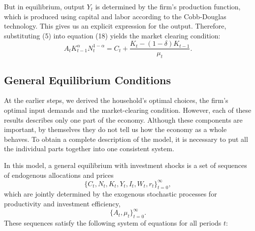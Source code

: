 \documentclass[12pt]{article}
\begin{document}
But in equilibrium, output $Y_t$ is determined by the firm's production function, which is produced using capital and labor according to the Cobb-Douglas technology. This gives us an explicit expression for the output.
Therefore, substituting (5) into equation (18) yields the market clearing condition:
\begin{equation}
A_t K_{t-1}^{\alpha} N_t^{1-\alpha}
= C_t + \frac{K_t - (1-\delta)K_{t-1}}{\mu_t}.
\tag{19}
\end{equation}


\subsection{General Equilibrium Conditions}
At the earlier steps, we derived the household’s optimal choices, the firm’s optimal input demands and the market-clearing condition. However, each of these results describes only one part of the economy. Although these components are important, by themselves they do not tell us how the economy as a whole behaves.
To obtain a complete description of the model, it is necessary to put all the individual parts together into one consistent system.

In this model, a general equilibrium with investment shocks is a set of sequences of endogenous allocations and prices 
\[
\{C_t, N_t, K_t, Y_t, I_t, W_t, r_t\}_{t=0}^{\infty},
\]
which are jointly determined by the exogenous stochastic processes for productivity and investment efficiency,
\[
\{A_t, \mu_t\}_{t=0}^{\infty}.
\]
These sequences satisfy the following system of equations for all periods $t$:
\end{document}
